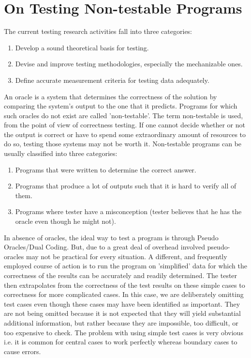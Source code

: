 \section{On Testing Non-testable Programs \cite{Weyuker}}
The current testing research activities fall into three categories:
\begin{enumerate}
  \item Develop a sound theoretical basis for testing.
  \item Devise and improve testing methodologies, especially the mechanizable ones.
  \item Define accurate measurement criteria for testing data adequately.
\end{enumerate}
An oracle is a system that determines the correctness of the solution by comparing the system’s output to the one that it predicts. Programs for which such oracles do not exist are called 'non-testable'. The term non-testable is used, from the point of view of correctness testing. If one cannot decide whether or not the output is correct or have to spend some extraordinary amount of resources to do so, testing those systems may not be worth it.
Non-testable programs can be usually classified into three categories:
\begin{enumerate}
  \item Programs that were written to determine the correct answer.
  \item Programs that produce a lot of outputs such that it is hard to verify all of them.
  \item Programs where tester have a misconception (tester believes that he has the oracle even though he might not).
\end{enumerate}
In absence of oracles, the ideal way to test a program is through Pseudo Oracles/Dual Coding. But, due to a great deal of overhead involved pseudo-oracles may not be practical for every situation. A different, and frequently employed course of action is to run the program on 'simplified' data for which the correctness of the results can be accurately and readily determined. The tester then extrapolates from the correctness of the test results on these simple cases to correctness for more complicated cases. In this case, we are deliberately omitting test cases even though these cases may have been identified as important. They are not being omitted because it is not expected that they will yield substantial additional information, but rather because they are impossible, too difficult, or too expensive to check. The problem with using simple test cases is very obvious i.e. it is common for central cases to work perfectly whereas boundary cases to cause errors.
